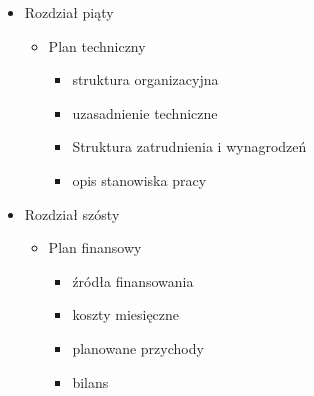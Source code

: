 \documentclass[
12pt, %
a4paper
]{article}
\begin{document}
\begin{itemize}
		\item Rozdział piąty
			\begin{itemize} 
				\item Plan techniczny
					\begin{itemize}
						\item struktura organizacyjna
						\item uzasadnienie techniczne
						\item Struktura zatrudnienia i wynagrodzeń
						\item opis stanowiska pracy
					\end{itemize}
			\end{itemize}
			
		\item Rozdział szósty
			\begin{itemize}
				\item Plan finansowy
					\begin{itemize}
						\item źródła finansowania
						\item koszty miesięczne
						\item planowane przychody
						\item bilans
					\end{itemize}
			\end{itemize}	
	\end{itemize}
\end{document}

